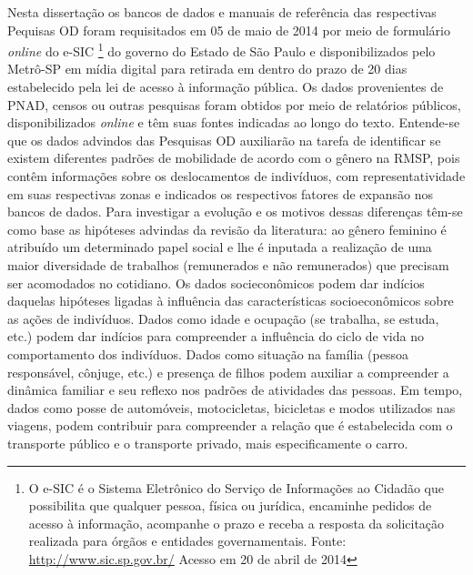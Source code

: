 Nesta dissertação os bancos de dados e manuais de referência das respectivas Pequisas OD foram requisitados em 05 de maio de 2014 por meio de formulário \emph{online} do e-SIC%
\footnote{O e-SIC é o Sistema Eletrônico do Serviço de Informações ao Cidadão que possibilita que qualquer pessoa, física ou jurídica, encaminhe pedidos de acesso à informação, acompanhe o prazo e receba a resposta da solicitação realizada para órgãos e entidades governamentais. Fonte: \url{http://www.sic.sp.gov.br/} Acesso em 20 de abril de 2014} do governo do Estado de São Paulo e disponibilizados pelo Metrô-SP em mídia digital para retirada em dentro do prazo de 20 dias estabelecido pela lei de acesso à informação pública.
Os dados provenientes de PNAD, censos ou outras pesquisas foram obtidos por meio de relatórios públicos, disponibilizados \emph{online} e têm suas fontes indicadas ao longo do texto. Entende-se que os dados advindos das Pesquisas OD auxiliarão na tarefa de identificar se existem diferentes padrões de mobilidade de acordo com o gênero na RMSP, pois contêm informações sobre os deslocamentos de indivíduos, com representatividade em suas respectivas zonas e indicados os respectivos fatores de expansão nos bancos de dados. Para investigar a evolução e os motivos dessas diferenças têm-se como base as hipóteses advindas da revisão da literatura: ao gênero feminino é atribuído um determinado papel social e lhe é inputada a realização de uma maior diversidade de trabalhos (remunerados e não remunerados) que precisam ser acomodados no cotidiano. Os dados socieconômicos podem dar indícios daquelas hipóteses ligadas à influência das características socioeconômicos sobre as ações de indivíduos. Dados como idade e ocupação (se trabalha, se estuda, etc.) podem dar indícios para compreender a influência do ciclo de vida no comportamento dos indivíduos. Dados como situação na família (pessoa responsável, cônjuge, etc.) e presença de filhos podem auxiliar a compreender a dinâmica familiar e seu reflexo nos padrões de atividades das pessoas. Em tempo, dados como posse de automóveis, motocicletas, bicicletas e modos utilizados nas viagens, podem contribuir para compreender a relação que é estabelecida com o transporte público e o transporte privado, mais especificamente o carro. 

